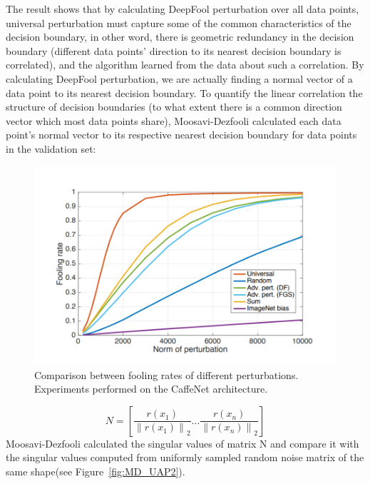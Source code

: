 \documentclass{article}
\begin{document}
The result shows that by calculating DeepFool perturbation over all data points, universal perturbation must capture some of the common characteristics of the decision boundary, in other word, there is geometric redundancy in the decision boundary (different data points’ direction to its nearest decision boundary is correlated), and the algorithm learned from the data about such a correlation. 
By calculating DeepFool perturbation, we are actually finding a normal vector of a data point to its nearest decision boundary. To quantify the linear correlation the structure of decision boundaries (to what extent there is a common direction vector which most data points share), Moosavi-Dezfooli calculated each data point’s normal vector to its respective nearest decision boundary for data points in the validation set:
 \begin{figure}
    \centering
    \includegraphics[width=\linewidth]{MD_UAP1.png}
    \caption{\small  Comparison between fooling rates of different perturbations. Experiments performed on the CaffeNet architecture. \cite{Moosavi-Dezfooli_2017_CVPR}}
    \label{fig:MD_UAP1}
\end{figure}
\begin{equation*}
N=\left[\frac{r\left(x_{1}\right)}{\left\|r\left(x_{1}\right)\right\|_{2}} \ldots \frac{r\left(x_{n}\right)}{\left\|r\left(x_{n}\right)\right\|_{2}}\right]
\end{equation*}
Moosavi-Dezfooli calculated the singular values of matrix N and compare it with the singular values computed from uniformly sampled random noise matrix of the same shape(see Figure~\ref{fig:MD_UAP2}). 
\end{document}
